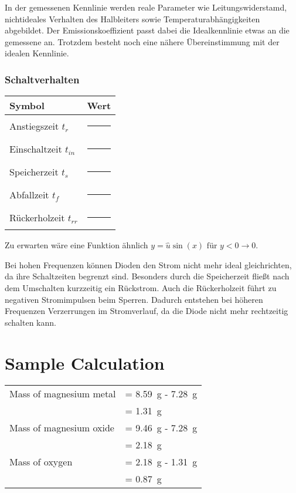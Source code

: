 \documentclass[
	a4paper, %
	12pt, %
]{CSUniSchoolLabReport}
\begin{document}
In der gemessenen Kennlinie werden reale Parameter wie Leitungswiderstamd, nichtideales Verhalten des Halbleiters sowie Temperaturabhängigkeiten abgebildet.
Der Emissionskoeffizient passt dabei die Idealkennlinie etwas an die gemessene an. Trotzdem besteht noch eine nähere Übereinstimmung mit der idealen Kennlinie.


\subsubsection{Schaltverhalten}

\begin{tabular}{ll}
\toprule
\textbf{Symbol} & \textbf{Wert} \\
\midrule
Anstiegszeit $t_r$    & \rule{3cm}{0.4pt} \\
Einschaltzeit $t_{in}$ & \rule{3cm}{0.4pt} \\
Speicherzeit  $t_s$    & \rule{3cm}{0.4pt} \\
Abfallzeit $t_f$    & \rule{3cm}{0.4pt} \\
Rückerholzeit $t_{rr}$ & \rule{3cm}{0.4pt} \\
\bottomrule
\end{tabular}
\par \par

Zu erwarten wäre eine Funktion ähnlich $y = \hat{u}\sin(x) \text{ für } y < 0 \rightarrow 0$.\par
Bei hohen Frequenzen können Dioden den Strom nicht mehr ideal gleichrichten, da ihre Schaltzeiten begrenzt sind. Besonders durch die Speicherzeit fließt nach dem Umschalten kurzzeitig ein Rückstrom. Auch die Rückerholzeit führt zu negativen Stromimpulsen beim Sperren. Dadurch entstehen bei höheren Frequenzen Verzerrungen im Stromverlauf, da die Diode nicht mehr rechtzeitig schalten kann.
\section{Sample Calculation}

\begin{tabular}{ll}
	Mass of magnesium metal & = \SI{8.59}{\gram} - \SI{7.28}{\gram}\\
	& = \SI{1.31}{\gram}\\
	Mass of magnesium oxide & = \SI{9.46}{\gram} - \SI{7.28}{\gram}\\
	& = \SI{2.18}{\gram}\\
	Mass of oxygen & = \SI{2.18}{\gram} - \SI{1.31}{\gram}\\
	& = \SI{0.87}{\gram}
\end{tabular}
\end{document}
